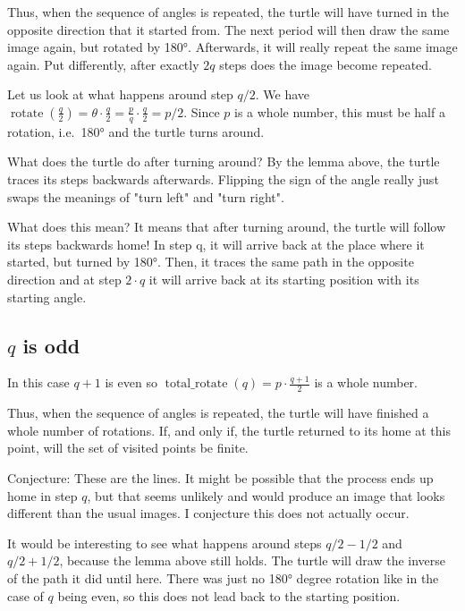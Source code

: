 \documentclass[pdftex,a4paper]{scrartcl}
\DeclareMathOperator{\rotate}{rotate}
\DeclareMathOperator{\total}{total\_rotate}
\begin{document}
Thus, when the sequence of angles is repeated, the turtle will have turned in the opposite direction that it started
from. The next period will then draw
the same image again, but rotated by 180°. Afterwards, it will really repeat the same image again. Put differently,
after exactly \(2q\) steps does the image become repeated.

Let us look at what happens around step \(q/2\). We have \(\rotate(\frac{q}{2})=\theta\cdot \frac{q}{2}
= \frac{p}{q} \cdot \frac{q}{2} = p/2\). Since \(p\) is a whole number, this must be half a rotation, i.e.\ 180° and the
turtle turns around.

What does the turtle do after turning around?
By the lemma above, the turtle traces its steps backwards afterwards. Flipping the sign of the angle really just swaps
the meanings of "turn left" and "turn right".

What does this mean? It means that after turning around, the turtle will follow its steps backwards home! In step
q, it will arrive back at the place where it started, but turned by 180°. Then, it traces the same path in the opposite
direction and at step \(2\cdot q\) it will arrive back at its starting position with its starting angle.

\subsection{$q$ is odd}
In this case \(q+1\) is even so \(\total(q)=p\cdot\frac{q+1}{2}\) is a whole number.

Thus, when the sequence of angles is repeated, the turtle will have finished a whole number of rotations. If, and only
if, the turtle returned to its home at this point, will the set of visited points be finite.

Conjecture: These are the lines. It might be possible that the process ends up home in step \(q\), but that seems
unlikely and would produce an image that looks different than the usual images. I conjecture this does not actually
occur.

It would be interesting to see what happens around steps \(q/2-1/2\) and \(q/2+1/2\), because the lemma above still
holds. The turtle will draw the inverse of the path it did until here. There was just no 180° degree rotation like in
the case of \(q\) being even, so this does not lead back to the starting position.
\end{document}
